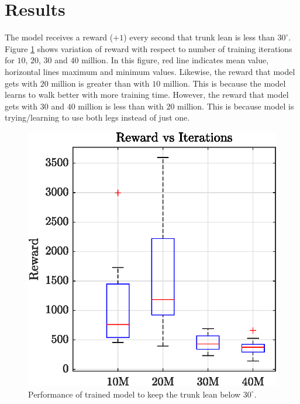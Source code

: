 \section{Results}
The model receives a reward ($+1$) every second that trunk lean is less than $30^{\circ}$. Figure \ref{fig:boxplot} shows variation of reward with respect to number of training iterations for $10$, $20$, $30$ and $40$ million. In this figure, red line indicates mean value, horizontal lines maximum and minimum values. Likewise, the reward that model gets with $20$ million is greater than with $10$ million. This is because the model learns to walk better with more training time. However, the reward that model gets with $30$ and $40$ million is less than with $20$ million. This is because model is trying/learning to use both legs instead of just one.


\begin{figure}
	\centering
	\includegraphics{images/reward_vs_iter.eps}
	\caption{Performance of trained model to keep the trunk lean below $30^{\circ}$.}
	\label{fig:boxplot}
\end{figure}

